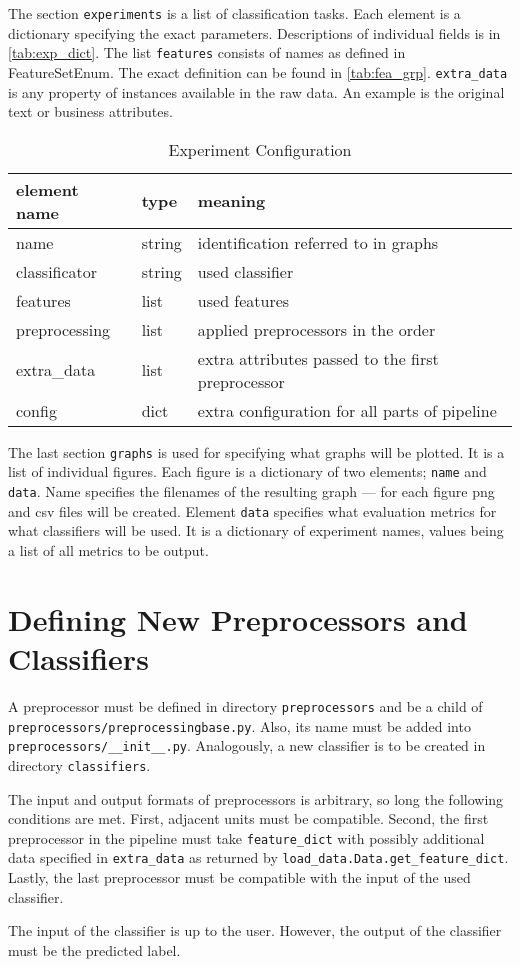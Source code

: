 The section \texttt{experiments} is a list of classification tasks.
Each element is a dictionary specifying the exact parameters.
Descriptions of individual fields is in \autoref{tab:exp_dict}.
The list \texttt{features} consists of names as defined in FeatureSetEnum.
The exact definition can be found in \autoref{tab:fea_grp}.
\texttt{extra\_data} is any property of instances available in the raw data.
An example is the original text or business attributes.

\begin{table}[h!]

\centering
\begin{tabular}{lll}
\toprule
\textbf{element name} & \textbf{type} & \textbf{meaning}\\
\midrule
name 			& string	& identification referred to in graphs\\
classificator 	& string	& used classifier\\
features 		& list		& used features \\
preprocessing 	& list		& applied preprocessors in the order\\
extra\_data 	& list 		& extra attributes passed to the first preprocessor \\
config			& dict		& extra configuration for all parts of pipeline \\
\bottomrule
\end{tabular}

\caption{Experiment Configuration}\label{tab:exp_dict}
\end{table}


The last section \texttt{graphs} is used for specifying what graphs will be plotted.
It is a list of individual figures.
Each figure is a dictionary of two elements; \texttt{name} and \texttt{data}.
Name specifies the filenames of the resulting graph ---
for each figure png and csv files will be created.
Element \texttt{data} specifies what evaluation metrics for what classifiers will be used.
It is a dictionary of experiment names, values being a list of all metrics to be output.


\section{Defining New Preprocessors and Classifiers}

A preprocessor must be defined in directory \texttt{preprocessors} and be a child of \texttt{preprocessors/preprocessingbase.py}.
Also, its name must be added into \texttt{preprocessors/\_\_init\_\_.py}.
Analogously, a new classifier is to be created in directory \texttt{classifiers}.

The input and output formats of preprocessors is arbitrary, so long the following conditions are met.
First, adjacent units must be compatible.
Second, the first preprocessor in the pipeline must take \texttt{feature\_dict} with possibly additional data specified in \texttt{extra\_data} as returned by \texttt{load\_data.Data.get\_feature\_dict}.
Lastly, the last preprocessor must be compatible with the input of the used classifier.

The input of the classifier is up to the user.
However, the output of the classifier must be the predicted label.

